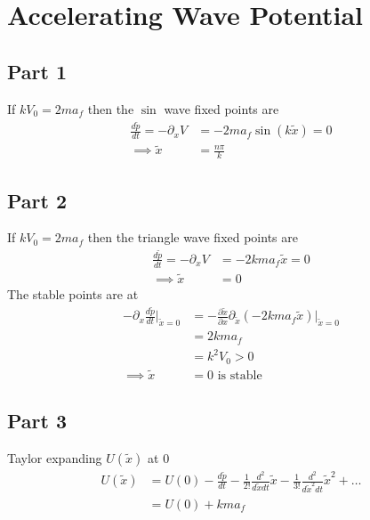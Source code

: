 \section{Accelerating Wave Potential}

\subsection{Part 1}
If $kV_0 = 2ma_f$ then the $\sin$ wave fixed points are
\begin{equation}
\begin{split}
    \frac{d\widetilde{p}}{dt} = -\partial_x V &= -2ma_f \sin(k \widetilde{x}) = 0\\
    \implies \widetilde{x} &= \frac{n\pi}{k}
\end{split}
\end{equation}

\subsection{Part 2}
If $kV_0 = 2ma_f$ then the triangle wave fixed points are
\begin{equation}
    \begin{split}
        \frac{d\widetilde{p}}{dt} = -\partial_x V&= -2kma_f \widetilde{x} = 0\\
        \implies \widetilde{x} &= 0
    \end{split}
\end{equation}
The stable points are at
\begin{equation}
    \begin{split}
        -\partial_x \frac{d\widetilde{p}}{dt}|_{\widetilde{x} =0} &= -\frac{\partial \widetilde{x}}{\partial x} \partial_{\widetilde{x}} (-2kma_f \widetilde{x})|_{\widetilde{x} =0}\\
        & = 2kma_f\\
        & = k^2 V_0 > 0\\
        \implies \widetilde{x} &= 0 \textrm{ is stable}
    \end{split}
\end{equation}

\subsection{Part 3}
Taylor expanding $U(\widetilde{x})$ at $0$
\begin{equation}
    \begin{split}
        U(\widetilde{x}) &= U(0) - \frac{d\widetilde{p}}{dt} - \frac{1}{2!}\frac{d^2}{d\widetilde{x}dt}\widetilde{x} - \frac{1}{3!}\frac{d^2}{d\widetilde{x}^2dt}\widetilde{x}^2 + \dots\\
         &= U(0)+kma_f
    \end{split}
\end{equation}

